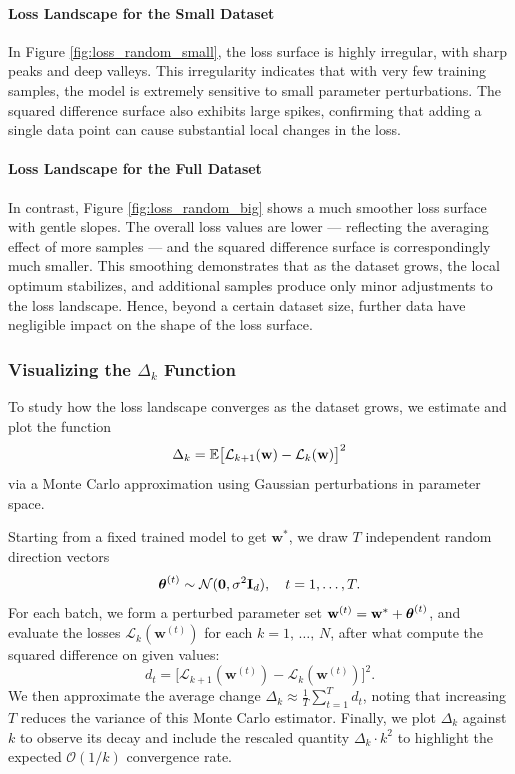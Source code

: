 \documentclass{article}
\begin{document}
\paragraph{Loss Landscape for the Small Dataset}
In Figure \ref{fig:loss_random_small}, the loss surface is highly irregular, with sharp peaks and deep valleys.
This irregularity indicates that with very few training samples, the model is extremely sensitive to small parameter perturbations.
The squared difference surface also exhibits large spikes, confirming that adding a single data point can cause substantial local changes
in the loss.

\paragraph{Loss Landscape for the Full Dataset}
In contrast, Figure \ref{fig:loss_random_big} shows a much smoother loss surface with gentle slopes. The overall loss
values are lower --- reflecting the averaging effect of more samples --- and the squared difference surface is correspondingly much smaller.
This smoothing demonstrates that as the dataset grows, the local optimum stabilizes, and additional samples produce only minor
adjustments to the loss landscape. Hence, beyond a certain dataset size, further data have negligible impact on the shape of the loss
surface.

\subsubsection{Visualizing the \texorpdfstring{$\Delta_k$}{Delta k} Function}

To study how the loss landscape converges as the dataset grows, we estimate and plot the function
$$
  \Delta_k =
  \mathbb{E} \bigl[ \mathcal{L}_{k+1}(\mathbf{w}) - \mathcal{L}_k(\mathbf{w}) \bigr]^2
$$
via a Monte Carlo approximation using Gaussian perturbations in parameter space.

Starting from a fixed trained model to get $\mathbf{w}^*$, we draw $T$ independent random direction vectors
$$
  \boldsymbol{\theta}^{(t)} \sim \mathcal{N}(\mathbf{0}, \sigma^2 \mathbf{I}_d), \quad t = 1, \dots, T.
$$
For each batch, we form a perturbed parameter set $\mathbf{w}^{(t)} = \mathbf{w}^* + \boldsymbol{\theta}^{(t)}$,
and evaluate the losses $\mathcal{L}_k(\mathbf{w}^{(t)})$ for each $k = 1, \, \dots, \, N$,
after what compute the squared difference on given values:
$$
  d_t = \bigl[\mathcal{L}_{k+1}(\mathbf{w}^{(t)}) - \mathcal{L}_k(\mathbf{w}^{(t)})\bigr]^2.
$$
We then approximate the average change
$\Delta_k \approx \frac{1}{T} \sum_{t=1}^T d_t$,
noting that increasing $T$ reduces the variance of this Monte Carlo estimator. Finally, we plot $\Delta_k$ against $k$ to observe its decay
and include the rescaled quantity $\Delta_k \cdot k^2$ to highlight the expected $\mathcal{O}(1/k)$ convergence rate.
\end{document}
